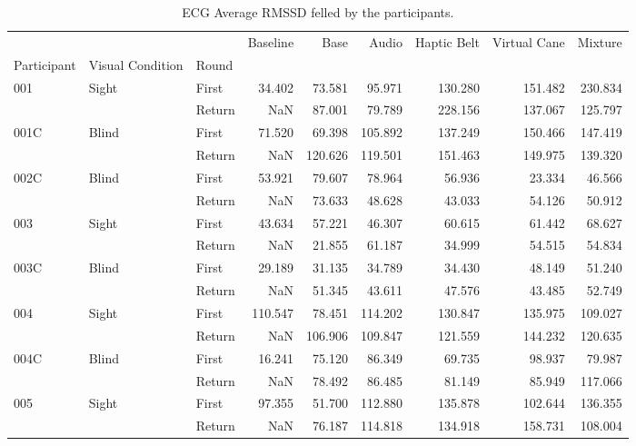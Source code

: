 
\begin{table}[!htb]
\centering
\caption{ECG Average RMSSD felled by the participants.}
\label{tab:ecg_rmssd_table}
\begin{tabular}{lllrrrrrr}
\toprule
    &       &        &  Baseline &    Base &   Audio &  Haptic Belt &  Virtual Cane &  Mixture \\
Participant & Visual Condition & Round &           &         &         &              &               &          \\
\midrule
001 & Sight & First &    34.402 &  73.581 &  95.971 &      130.280 &       151.482 &  230.834 \\
    &       & Return &       NaN &  87.001 &  79.789 &      228.156 &       137.067 &  125.797 \\
001C & Blind & First &    71.520 &  69.398 & 105.892 &      137.249 &       150.466 &  147.419 \\
    &       & Return &       NaN & 120.626 & 119.501 &      151.463 &       149.975 &  139.320 \\
002C & Blind & First &    53.921 &  79.607 &  78.964 &       56.936 &        23.334 &   46.566 \\
    &       & Return &       NaN &  73.633 &  48.628 &       43.033 &        54.126 &   50.912 \\
003 & Sight & First &    43.634 &  57.221 &  46.307 &       60.615 &        61.442 &   68.627 \\
    &       & Return &       NaN &  21.855 &  61.187 &       34.999 &        54.515 &   54.834 \\
003C & Blind & First &    29.189 &  31.135 &  34.789 &       34.430 &        48.149 &   51.240 \\
    &       & Return &       NaN &  51.345 &  43.611 &       47.576 &        43.485 &   52.749 \\
004 & Sight & First &   110.547 &  78.451 & 114.202 &      130.847 &       135.975 &  109.027 \\
    &       & Return &       NaN & 106.906 & 109.847 &      121.559 &       144.232 &  120.635 \\
004C & Blind & First &    16.241 &  75.120 &  86.349 &       69.735 &        98.937 &   79.987 \\
    &       & Return &       NaN &  78.492 &  86.485 &       81.149 &        85.949 &  117.066 \\
005 & Sight & First &    97.355 &  51.700 & 112.880 &      135.878 &       102.644 &  136.355 \\
    &       & Return &       NaN &  76.187 & 114.818 &      134.918 &       158.731 &  108.004 \\
\bottomrule
\end{tabular}
\end{table}

